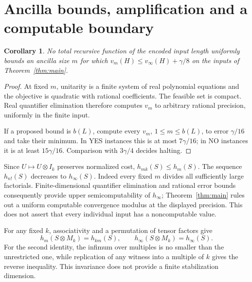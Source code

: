\documentclass[11pt,a4paper]{article}
\newtheorem{corollary}[theorem]{Corollary}
\begin{document}
\section{Ancilla bounds, amplification and a computable boundary}
\begin{corollary}\label{cor:bound}
No total recursive function of the encoded input length uniformly bounds an ancilla size $m$ for which
$v_m(H)\le v_\infty(H)+\gamma/8$ on the inputs of Theorem~\ref{thm:main}.
\end{corollary}
\begin{proof}
At fixed $m$, unitarity is a finite system of real polynomial equations and the objective is quadratic with rational coefficients. The feasible set is compact. Real quantifier elimination therefore computes $v_m$ to arbitrary rational precision, uniformly in the finite input.

If a proposed bound is $b(L)$, compute every $v_m$, $1\le m\le b(L)$, to error $\gamma/16$ and take their minimum. In YES instances this is at most $7\gamma/16$; in NO instances it is at least $15\gamma/16$. Comparison with $3\gamma/4$ decides halting.
\end{proof}

Since $U\mapsto U\otimes I_k$ preserves normalized cost, $h_{mk}(S)\le h_m(S)$.
The sequence $h_{n!}(S)$ decreases to $h_\infty(S)$. Indeed every fixed $m$ divides all sufficiently large factorials. Finite-dimensional quantifier elimination and rational error bounds consequently provide upper semicomputability of $h_\infty$; Theorem~\ref{thm:main} rules out a uniform computable convergence modulus at the displayed precision. This does not assert that every individual input has a noncomputable value.

For any fixed $k$, associativity and a permutation of tensor factors give
\[
 h_m(S\otimes M_k)=h_{km}(S),\qquad
 h_\infty(S\otimes M_k)=h_\infty(S).
\]
For the second identity, the infimum over multiples is no smaller than the unrestricted one, while replication of any witness into a multiple of $k$ gives the reverse inequality. This invariance does not provide a finite stabilization dimension.
\end{document}
